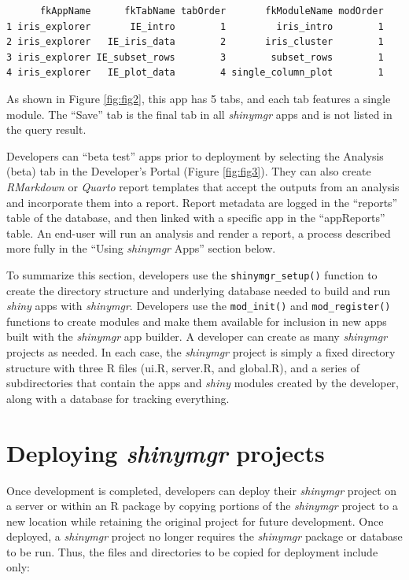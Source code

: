 \begin{verbatim}
      fkAppName      fkTabName tabOrder       fkModuleName modOrder
1 iris_explorer       IE_intro        1         iris_intro        1
2 iris_explorer   IE_iris_data        2       iris_cluster        1
3 iris_explorer IE_subset_rows        3        subset_rows        1
4 iris_explorer   IE_plot_data        4 single_column_plot        1
\end{verbatim}

As shown in Figure \ref{fig:fig2}, this app has 5 tabs, and each tab features a single module. The ``Save'' tab is the final tab in all \emph{shinymgr} apps and is not listed in the query result.

Developers can ``beta test'' apps prior to deployment by selecting the Analysis (beta) tab in the Developer's Portal (Figure \ref{fig:fig3}). They can also create \emph{RMarkdown} or \emph{Quarto} report templates that accept the outputs from an analysis and incorporate them into a report. Report metadata are logged in the ``reports'' table of the database, and then linked with a specific app in the ``appReports'' table. An end-user will run an analysis and render a report, a process described more fully in the ``Using \emph{shinymgr} Apps'' section below.

To summarize this section, developers use the \texttt{shinymgr\_setup()} function to create the directory structure and underlying database needed to build and run \emph{shiny} apps with \emph{shinymgr}. Developers use the \texttt{mod\_init()} and \texttt{mod\_register()} functions to create modules and make them available for inclusion in new apps built with the \emph{shinymgr} app builder. A developer can create as many \emph{shinymgr} projects as needed. In each case, the \emph{shinymgr} project is simply a fixed directory structure with three R files (ui.R, server.R, and global.R), and a series of subdirectories that contain the apps and \emph{shiny} modules created by the developer, along with a database for tracking everything.

\section{\texorpdfstring{Deploying \emph{shinymgr} projects}{Deploying shinymgr projects}}\label{appdeploy}

Once development is completed, developers can deploy their \emph{shinymgr} project on a server or within an R package by copying portions of the \emph{shinymgr} project to a new location while retaining the original project for future development. Once deployed, a \emph{shinymgr} project no longer requires the \emph{shinymgr} package or database to be run. Thus, the files and directories to be copied for deployment include only:

